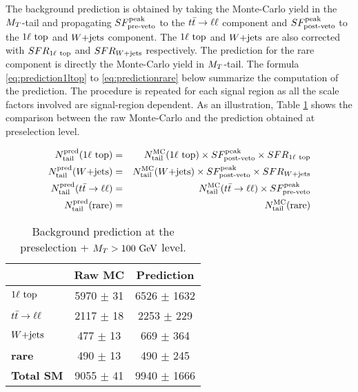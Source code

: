         The background prediction is obtained by taking the Monte-Carlo yield in the
        $M_T$-tail and propagating $SF_{\text{pre-veto}}^{\text{peak}}$ to the $t\bar{t} \rightarrow \ell \ell$ component and $SF_{\text{post-veto}}^{\text{peak}}$
        to the $1\ell~\text{top}$ and $\text{$W$+jets}$ component. The $1\ell~\text{top}$ and $\text{$W$+jets}$
        are also corrected with $SFR_{1\ell~\text{top}}$ and $SFR_{\text{$W$+jets}}$ respectively. The
        prediction for the rare component is directly the Monte-Carlo yield in $M_T$-tail.
        The formula \ref{eq:prediction1ltop} to \ref{eq:predictionrare} below summarize
        the computation of the prediction. The procedure is repeated for each signal
        region as all the scale factors involved are signal-region dependent. As an
        illustration, Table \ref{tab:predictionPreselection} shows the comparison between
        the raw Monte-Carlo and the prediction obtained at preselection level.

        \begin{eqnarray}
            N^\text{pred}_\text{tail}(1\ell~\text{top}) & = & N^\text{MC}_\text{tail}(1\ell~\text{top})  \times SF_{\text{post-veto}}^{\text{peak}} \times SFR_{1\ell~\text{top}} \label{eq:prediction1ltop}  \\
            N^\text{pred}_\text{tail}(\text{$W$+jets})        & = & N^\text{MC}_\text{tail}(\text{$W$+jets})         \times SF_{\text{post-veto}}^{\text{peak}}  \times SFR_{\text{$W$+jets}}                             \\
            N^\text{pred}_\text{tail}(t\bar{t} \rightarrow \ell \ell)  & = & N^\text{MC}_\text{tail}(t\bar{t} \rightarrow \ell \ell)   \times SF_{\text{pre-veto}}^{\text{peak}}                                                \\
            N^\text{pred}_\text{tail}(\text{rare})   & = & N^\text{MC}_\text{tail}(\text{rare})                                           \label{eq:predictionrare}
        \end{eqnarray}

        \begin{table}[!h]
            \begin{center}
                \begin{tabular}{|l|c|c|}
                    \hline
                                             &  \textbf{Raw MC}    & \textbf{Prediction}       \\
                    \hline
                    \textbf{$1\ell~\text{top}$} &  5970 $\pm$ 31      & 6526 $\pm$ 1632     \\
                    \textbf{$t\bar{t} \rightarrow \ell \ell$}  &  2117 $\pm$ 18      & 2253 $\pm$  229     \\
                    \textbf{$\text{$W$+jets}$}        &   477 $\pm$ 13      &  669 $\pm$  364     \\
                    \textbf{rare}            &   490 $\pm$ 13      &  490 $\pm$  245     \\
                    \hline
                    \textbf{Total SM}        &  9055 $\pm$ 41      & 9940 $\pm$ 1666     \\
                    \hline
                \end{tabular}
                \caption{ Background prediction at the preselection + $M_T > 100~\text{GeV}$ level.}
                \label{tab:predictionPreselection}
            \end{center}
        \end{table}

